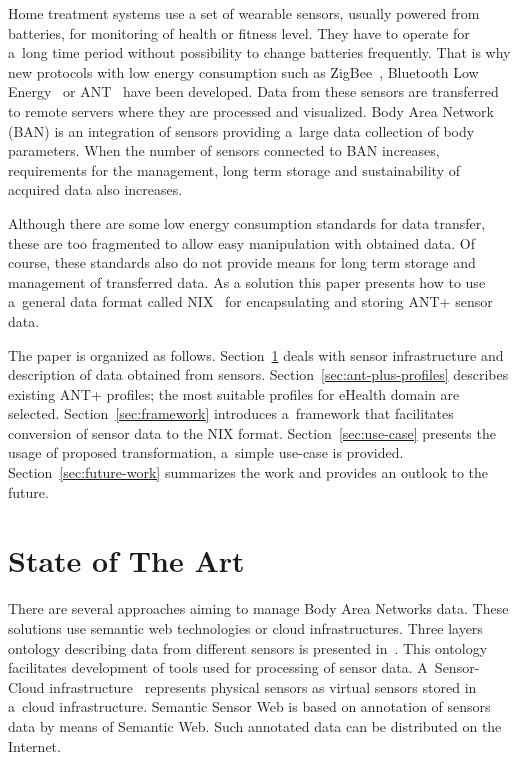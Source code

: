 \documentclass[a4paper,twoside]{article}
\begin{document}
Home treatment systems use a set of wearable sensors, usually powered from batteries, for monitoring of health or fitness level. They have to operate for a~long time period without possibility to change batteries frequently. That is why new protocols with low energy consumption such as ZigBee~\cite{Farahani:2008:ZWN:1457417}, Bluetooth Low Energy~\cite{heydon2012bluetooth} or ANT~\cite{zaloker2014ant} have been developed. Data from these sensors are transferred to remote servers where they are processed and visualized. Body Area Network (BAN) is an integration of sensors providing a~large data collection of body parameters.  When the number of sensors connected to BAN increases, requirements for the management, long term storage and sustainability of acquired data also increases.

Although there are some low energy consumption standards for data transfer, these are too fragmented to allow easy manipulation with obtained data. Of course, these standards also do not provide means for long term storage and management of transferred data. As a solution this paper presents how to use a~general data format called NIX~\cite{Stoewer:2014} for encapsulating and storing ANT+ sensor data.

The paper is organized as follows. Section~\ref{sec:state-of-the-art} deals with sensor infrastructure and description of data obtained from sensors. Section~\ref{sec:ant-plus-profiles} describes existing ANT+ profiles; the most suitable profiles for eHealth domain are selected. Section~\ref{sec:framework} introduces a~framework that facilitates conversion of sensor data to the NIX format. Section~\ref{sec:use-case} presents the usage of proposed transformation, a~simple use-case is provided. Section~\ref{sec:future-work} summarizes the work and provides an outlook to the future.

\section{State of The Art}\label{sec:state-of-the-art}

There are several approaches aiming to manage Body Area Networks data. These solutions use semantic web technologies or cloud infrastructures. Three layers ontology describing data from different sensors is presented in~\cite{mehmood2014ontology}. This ontology facilitates development of tools used for processing of sensor data. A~Sensor-Cloud infrastructure~\cite{5635688} represents physical sensors as virtual sensors stored in a~cloud infrastructure. Semantic Sensor Web \cite{4557983} is based on annotation of sensors data by means of Semantic Web. Such annotated data can be distributed on the Internet.
\end{document}
